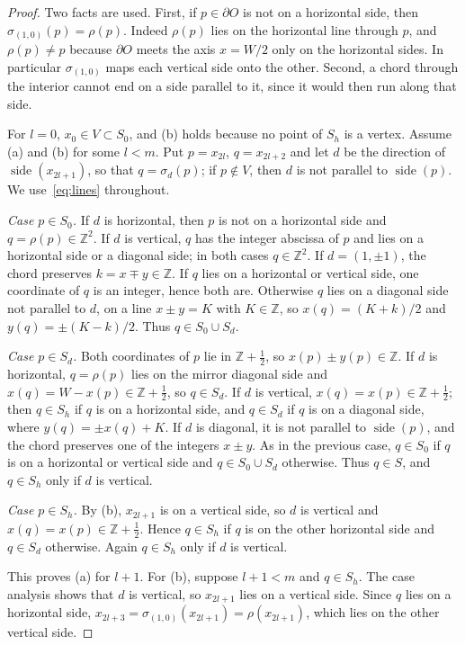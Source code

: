 \documentclass[11pt]{amsart}
\theoremstyle{definition}
\theoremstyle{remark}
\newcommand{\Z}{\mathbb Z}
\newcommand{\side}{\operatorname{side}}
\begin{document}
\begin{proof}
Two facts are used. First, if $p\in\partial O$ is not on a horizontal side, then $\sigma_{(1,0)}(p)=\rho(p)$. Indeed $\rho(p)$ lies on the horizontal line through $p$, and $\rho(p)\ne p$ because $\partial O$ meets the axis $x=W/2$ only on the horizontal sides. In particular $\sigma_{(1,0)}$ maps each vertical side onto the other. Second, a chord through the interior cannot end on a side parallel to it, since it would then run along that side.

For $l=0$, $x_0\in V\subset S_0$, and (b) holds because no point of $S_h$ is a vertex. Assume (a) and (b) for some $l<m$. Put $p=x_{2l}$, $q=x_{2l+2}$ and let $d$ be the direction of $\side(x_{2l+1})$, so that $q=\sigma_d(p)$; if $p\notin V$, then $d$ is not parallel to $\side(p)$. We use~\eqref{eq:lines} throughout.

\emph{Case $p\in S_0$.} If $d$ is horizontal, then $p$ is not on a horizontal side and $q=\rho(p)\in\Z^2$. If $d$ is vertical, $q$ has the integer abscissa of $p$ and lies on a horizontal side or a diagonal side; in both cases $q\in\Z^2$. If $d=(1,\pm1)$, the chord preserves $k=x\mp y\in\Z$. If $q$ lies on a horizontal or vertical side, one coordinate of $q$ is an integer, hence both are. Otherwise $q$ lies on a diagonal side not parallel to $d$, on a line $x\pm y=K$ with $K\in\Z$, so $x(q)=(K+k)/2$ and $y(q)=\pm(K-k)/2$. Thus $q\in S_0\cup S_d$.

\emph{Case $p\in S_d$.} Both coordinates of $p$ lie in $\Z+\frac12$, so $x(p)\pm y(p)\in\Z$. If $d$ is horizontal, $q=\rho(p)$ lies on the mirror diagonal side and $x(q)=W-x(p)\in\Z+\frac12$, so $q\in S_d$. If $d$ is vertical, $x(q)=x(p)\in\Z+\frac12$; then $q\in S_h$ if $q$ is on a horizontal side, and $q\in S_d$ if $q$ is on a diagonal side, where $y(q)=\pm x(q)+K$. If $d$ is diagonal, it is not parallel to $\side(p)$, and the chord preserves one of the integers $x\pm y$. As in the previous case, $q\in S_0$ if $q$ is on a horizontal or vertical side and $q\in S_0\cup S_d$ otherwise. Thus $q\in S$, and $q\in S_h$ only if $d$ is vertical.

\emph{Case $p\in S_h$.} By (b), $x_{2l+1}$ is on a vertical side, so $d$ is vertical and $x(q)=x(p)\in\Z+\frac12$. Hence $q\in S_h$ if $q$ is on the other horizontal side and $q\in S_d$ otherwise. Again $q\in S_h$ only if $d$ is vertical.

This proves (a) for $l+1$. For (b), suppose $l+1<m$ and $q\in S_h$. The case analysis shows that $d$ is vertical, so $x_{2l+1}$ lies on a vertical side. Since $q$ lies on a horizontal side, $x_{2l+3}=\sigma_{(1,0)}(x_{2l+1})=\rho(x_{2l+1})$, which lies on the other vertical side.
\end{proof}
\end{document}
